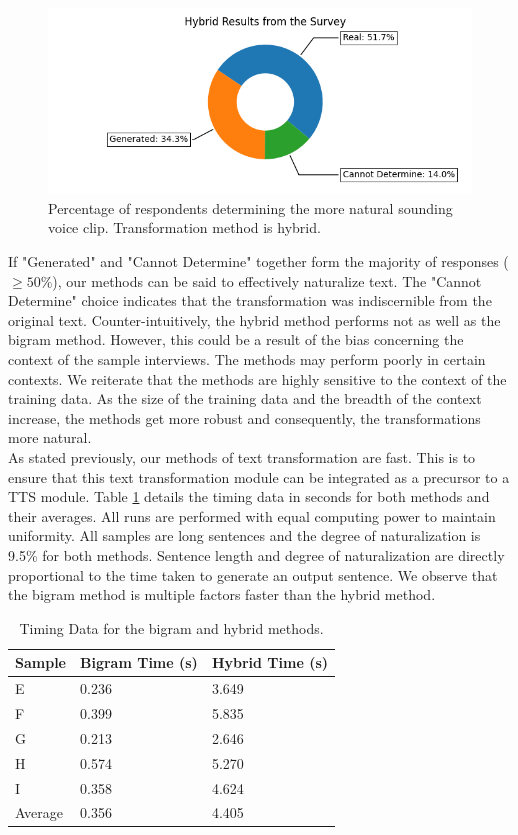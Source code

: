 \documentclass[journal]{IEEEtran}
\begin{document}
\begin{figure}
\centerline{\includegraphics[width=\columnwidth]{hybrid.png}}
\caption{Percentage of respondents determining the more natural sounding voice clip. Transformation method is hybrid.}
\label{fig2}
\end{figure}

If "Generated" and "Cannot Determine" together form the majority of responses ($\geq 50\%$), our methods can be said to effectively naturalize text. The "Cannot Determine" choice indicates that the transformation was indiscernible from the original text. Counter-intuitively, the hybrid method performs not as well as the bigram method. However, this could be a result of the bias concerning the context of the sample interviews. The methods may perform poorly in certain contexts. We reiterate that the methods are highly sensitive to the context of the training data. As the size of the training data and the breadth of the context increase, the methods get more robust and consequently, the transformations more natural. \\

As stated previously, our methods of text transformation are fast. This is to ensure that this text transformation module can be integrated as a precursor to a TTS module. Table \ref{tab5} details the timing data in seconds for both methods and their averages. All runs are performed with equal computing power to maintain uniformity. All samples are long sentences and the degree of naturalization is 9.5\% for both methods. Sentence length and degree of naturalization are directly proportional to the time taken to generate an output sentence. We observe that the bigram method is multiple factors faster than the hybrid method.


\begin{table}
\caption{Timing Data for the bigram and hybrid methods.}
\label{tab5}
\small
\setlength{\tabcolsep}{3pt}
\begin{tabular}{|p{77pt}|p{77pt}|p{77pt}|}
\hline
Sample& 
Bigram Time (s)& 
Hybrid Time (s) \\
\hline
E & 0.236 & 3.649 \\
F & 0.399 & 5.835 \\
G & 0.213 & 2.646 \\
H & 0.574 & 5.270 \\
I & 0.358 & 4.624 \\
\hline
Average & 0.356 & 4.405 \\
\hline
\end{tabular}
\label{tab5}
\end{table}
\end{document}
